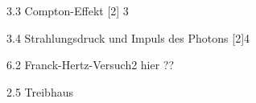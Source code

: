 3.3 Compton-Effekt [2] 3	

3.4 Strahlungsdruck und Impuls des Photons [2]4	

6.2 Franck-Hertz-Versuch2	hier ??

2.5 Treibhaus









